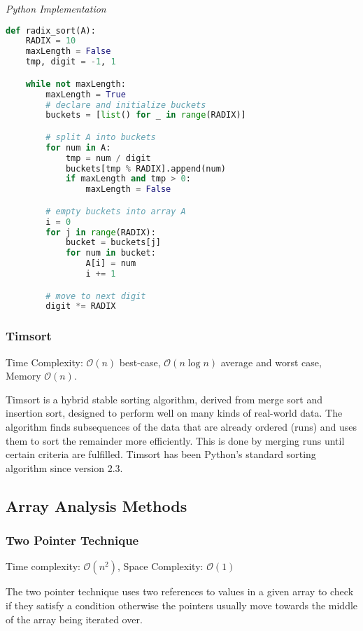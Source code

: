 \documentclass{article}
\newcommand{\bigO}{\mathcal{O}}
\begin{document}
\vspace{8pt} \emph{Python Implementation}
\begin{lstlisting}[language=Python]
def radix_sort(A):
    RADIX = 10
    maxLength = False
    tmp, digit = -1, 1

    while not maxLength:
        maxLength = True
        # declare and initialize buckets
        buckets = [list() for _ in range(RADIX)]

        # split A into buckets
        for num in A:
            tmp = num / digit
            buckets[tmp % RADIX].append(num)
            if maxLength and tmp > 0:
                maxLength = False

        # empty buckets into array A
        i = 0
        for j in range(RADIX):
            bucket = buckets[j]
            for num in bucket:
                A[i] = num
                i += 1

        # move to next digit
        digit *= RADIX
\end{lstlisting}
    
    \subsubsection{Timsort}
    Time Complexity: $\bigO(n)$ best-case, $\bigO(n\log n)$  average and worst case, Memory $\bigO(n)$.
    
    Timsort is a hybrid stable sorting algorithm, derived from merge sort and insertion sort, designed to perform well on many kinds of real-world data. The algorithm finds subsequences of the data that are already ordered (runs) and uses them to sort the remainder more efficiently. This is done by merging runs until certain criteria are fulfilled. Timsort has been Python's standard sorting algorithm since version 2.3.
    
    \subsection{Array Analysis Methods}
    
    \subsubsection{Two Pointer Technique}
    Time complexity: $\bigO(n^2)$, Space Complexity: $\bigO(1)$
    
    The two pointer technique uses two references to values in a given array to check if they satisfy a condition otherwise the pointers usually move towards the middle of the array being iterated over.
    
\end{document}
